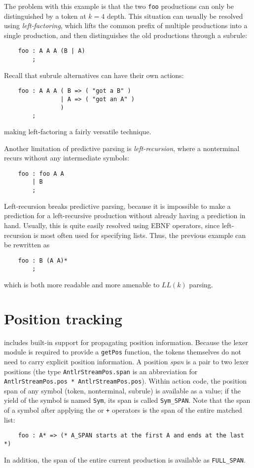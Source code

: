 The problem with this example is that the two {\tt foo} productions can only be distinguished by a token at $k = 4$ depth.  This situation can usually be resolved using \emph{left-factoring}, which lifts the common prefix of multiple productions into a single production, and then distinguishes the old productions through a subrule:
\begin{verbatim}
    foo : A A A (B | A)
        ;
\end{verbatim}
Recall that subrule alternatives can have their own actions:
\begin{verbatim}
    foo : A A A ( B => ( "got a B" ) 
                | A => ( "got an A" )
                )
        ;
\end{verbatim}
making left-factoring a fairly versatile technique.

Another limitation of predictive parsing is \emph{left-recursion}, where a nonterminal recurs without any intermediate symbols:
\begin{verbatim}
    foo : foo A A
        | B
        ;
\end{verbatim}
Left-recursion breaks predictive parsing, because it is impossible to make a prediction for a left-recursive production without already having a prediction in hand.  Usually, this is quite easily resolved using EBNF operators, since left-recursion is most often used for specifying lists.  Thus, the previous example can be rewritten as
\begin{verbatim}
    foo : B (A A)*
        ;
\end{verbatim}
which is both more readable and more amenable to $LL(k)$ parsing.

\section{Position tracking}

\antlr{} includes built-in support for propagating position information.  Because the lexer module is required to provide a {\tt getPos} function, the tokens themselves do not need to carry explicit position information.
A position \emph{span} is a pair to two lexer positions (the type {\tt AntlrStreamPos.span} is an abbreviation for {\tt AntlrStreamPos.pos * AntlrStreamPos.pos}).
Within action code, the position span of any symbol (token, nonterminal, subrule) is available as a value; if the yield of the symbol is named {\tt Sym}, its span is called {\tt Sym\_SPAN}.
Note that the span of a symbol after applying the {\tt *} or {\tt +} operators is the span of the entire matched list:
\begin{verbatim}
    foo : A* => (* A_SPAN starts at the first A and ends at the last *)
\end{verbatim}
In addition, the span of the entire current production is available as {\tt FULL\_SPAN}.


